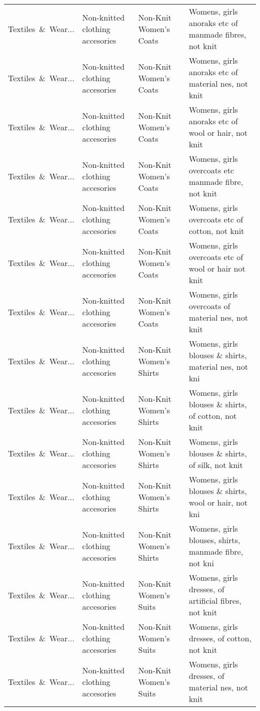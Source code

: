 \begin{appendices}
\begin{xltabular}{\textwidth}{|p{0.10\textwidth}|p{0.25\textwidth}|p{0.24\textwidth}|p{0.31\textwidth}|}
Textiles\ \&\ Wear... & Non-knitted clothing accesories & Non-Knit Women's Coats & Womens, girls anoraks etc of manmade fibres, not knit \\
Textiles\ \&\ Wear... & Non-knitted clothing accesories & Non-Knit Women's Coats & Womens, girls anoraks etc of material nes, not knit \\
Textiles\ \&\ Wear... & Non-knitted clothing accesories & Non-Knit Women's Coats & Womens, girls anoraks etc of wool or hair, not knit \\
Textiles\ \&\ Wear... & Non-knitted clothing accesories & Non-Knit Women's Coats & Womens, girls overcoats etc manmade fibre, not knit \\
Textiles\ \&\ Wear... & Non-knitted clothing accesories & Non-Knit Women's Coats & Womens, girls overcoats etc of cotton, not knit \\
Textiles\ \&\ Wear... & Non-knitted clothing accesories & Non-Knit Women's Coats & Womens, girls overcoats etc of wool or hair not knit \\
Textiles\ \&\ Wear... & Non-knitted clothing accesories & Non-Knit Women's Coats & Womens, girls overcoats of material nes, not knit \\
Textiles\ \&\ Wear... & Non-knitted clothing accesories & Non-Knit Women's Shirts & Womens, girls blouses \& shirts, material nes, not kni \\
Textiles\ \&\ Wear... & Non-knitted clothing accesories & Non-Knit Women's Shirts & Womens, girls blouses \& shirts, of cotton, not knit \\
Textiles\ \&\ Wear... & Non-knitted clothing accesories & Non-Knit Women's Shirts & Womens, girls blouses \& shirts, of silk, not knit \\
Textiles\ \&\ Wear... & Non-knitted clothing accesories & Non-Knit Women's Shirts & Womens, girls blouses \& shirts, wool or hair, not kni \\
Textiles\ \&\ Wear... & Non-knitted clothing accesories & Non-Knit Women's Shirts & Womens, girls blouses, shirts, manmade fibre, not kni \\
Textiles\ \&\ Wear... & Non-knitted clothing accesories & Non-Knit Women's Suits & Womens, girls dresses, of artificial fibres, not knit \\
Textiles\ \&\ Wear... & Non-knitted clothing accesories & Non-Knit Women's Suits & Womens, girls dresses, of cotton, not knit \\
Textiles\ \&\ Wear... & Non-knitted clothing accesories & Non-Knit Women's Suits & Womens, girls dresses, of material nes, not knit \\

\end{xltabular}
\end{appendices}
